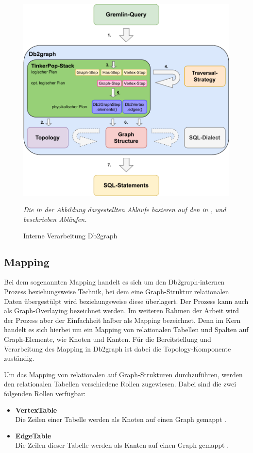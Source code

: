\begin{figure}[h]
    \centering
    \includegraphics[width=\textwidth]{images/db2graph_intern_processing.pdf}
    \caption{Interne Verarbeitung Db2graph}
    \label{fig:db2graph_intern_processing}
    \vspace{1em}
    \textit{Die in der Abbildung dargestellten Abläufe basieren auf den in \cite{yt_tian}, \cite{vldb_tian} und \cite{sigmod_tian} beschrieben Abläufen.} 
\end{figure}

\subsection{Mapping}
Bei dem sogenannten Mapping handelt es sich um den Db2graph-internen Prozess beziehungsweise Technik, bei dem eine Graph-Struktur relationalen Daten überge\-stülpt wird beziehungsweise diese überlagert. Der Prozess kann auch als Graph-Overlaying bezeichnet werden. Im weiteren Rahmen der Arbeit wird der Prozess aber der Einfachheit halber als Mapping bezeichnet. Denn im Kern handelt es sich hierbei um ein Mapping von relationalen Tabellen und Spalten auf Graph-Elemente, wie Knoten und Kanten. Für die Bereitstellung und Verarbeitung des Mapping in Db2graph ist dabei die Topology-Komponente zuständig. 

Um das Mapping von relationalen auf Graph-Strukturen durchzuführen, werden den relationalen Tabellen verschiedene Rollen zugewiesen. Dabei sind die zwei folgenden Rollen verfügbar:
\begin{itemize}
    \item \textbf{VertexTable}\\Die Zeilen einer Tabelle werden als Knoten auf einen Graph gemappt \cite{sigmod_tian, yt_tian}.
    \item \textbf{EdgeTable}\\Die Zeilen dieser Tabelle werden als Kanten auf einen Graph gemappt \cite{sigmod_tian, yt_tian}.
\end{itemize}

